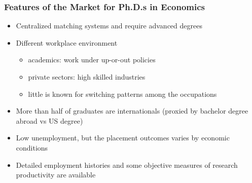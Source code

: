 \documentclass[11pt]{beamer}
\begin{document}
\begin{frame}
	\frametitle{Features of the Market for Ph.D.s in Economics}
	\begin{itemize}
		
							    \item Centralized matching systems and require advanced degrees
							    \vspace{1.5mm}
							    \item Different workplace environment
							    \begin{itemize}
							    	\item academics: work under up-or-out policies
							    	\vspace{.5 mm} %
							    	\item private sectors:  high skilled industries
							 	    \vspace{.5 mm}
							 	    \item little is known for switching patterns among the occupations   
						     \end{itemize}
					     \vspace{1.5mm}
					     		\item More than half of graduates are internationals (proxied by bachelor degree abroad vs US degree)
			   				    \vspace{1.5mm}
			   				    \item Low unemployment, but the placement outcomes varies by economic conditions
			   				   \vspace{1.5mm}
			   				    \item Detailed employment histories and some objective measures of research productivity are available
		
	\end{itemize}
\end{frame}
\end{document}
